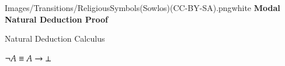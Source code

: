 


\begin{transitionframe}{Images/Transitions/ReligiousSymbols(Sowlos)(CC-BY-SA).png}{white}
\textbf{Modal Natural Deduction Proof}
\end{transitionframe}



\begin{frame}[shrink]{Natural Deduction Calculus}

\begin{unnamedCalculus}

\vspace{1em}

\s\s
{}
\s\s
{}
\s\s
{}

\vspace{2em}

\s\s
{}
\s\s
{}
\s\s
{}

\vspace{2em}

\s\s
{}
\s\s
{}
\s\s
{}

\vspace{2em}

\s
{}
\s
{}
\s\s
{}
\s
{}

\vspace{1em}

\s\s\s\s
$\neg A \equiv A \rightarrow \bot$ 
\s\s\s 
\alert{}

\vspace{1em}

\end{unnamedCalculus}

\end{frame}



